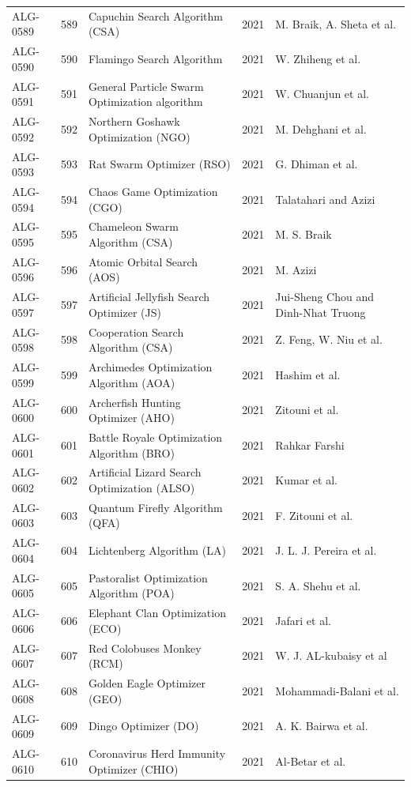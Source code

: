 \documentclass[8pt]{article}
\begin{document}
\begin{landscape}
\begin{longtable}{P{1.7cm}rP{10.0cm}rP{7.2cm}}
ALG-0589 & 589 & Capuchin Search Algorithm (CSA) & 2021 & M. Braik, A. Sheta et al. \\
ALG-0590 & 590 & Flamingo Search Algorithm & 2021 & W. Zhiheng et al. \\
ALG-0591 & 591 & General Particle Swarm Optimization algorithm & 2021 & W. Chuanjun  et al. \\
ALG-0592 & 592 & Northern Goshawk Optimization (NGO) & 2021 & M. Dehghani et al. \\
ALG-0593 & 593 & Rat Swarm Optimizer (RSO) & 2021 & G. Dhiman et al. \\
ALG-0594 & 594 & Chaos Game Optimization (CGO) & 2021 & Talatahari and Azizi \\
ALG-0595 & 595 & Chameleon Swarm Algorithm (CSA) & 2021 & M. S. Braik \\
ALG-0596 & 596 & Atomic Orbital Search (AOS) & 2021 & M. Azizi \\
ALG-0597 & 597 & Artificial Jellyfish Search Optimizer (JS) & 2021 & Jui-Sheng Chou and Dinh-Nhat Truong \\
ALG-0598 & 598 & Cooperation Search Algorithm (CSA) & 2021 & Z. Feng, W. Niu et al. \\
ALG-0599 & 599 & Archimedes Optimization Algorithm (AOA) & 2021 & Hashim et al. \\
ALG-0600 & 600 & Archerfish Hunting Optimizer (AHO) & 2021 & Zitouni et al. \\
ALG-0601 & 601 & Battle Royale Optimization Algorithm (BRO) & 2021 & Rahkar Farshi \\
ALG-0602 & 602 & Artificial Lizard Search Optimization (ALSO) & 2021 & Kumar et al. \\
ALG-0603 & 603 & Quantum Firefly Algorithm (QFA) & 2021 & F. Zitouni et al. \\
ALG-0604 & 604 & Lichtenberg Algorithm (LA) & 2021 & J. L. J. Pereira et al. \\
ALG-0605 & 605 & Pastoralist Optimization Algorithm (POA) & 2021 & S. A. Shehu et al. \\
ALG-0606 & 606 & Elephant Clan Optimization (ECO) & 2021 & Jafari et al. \\
ALG-0607 & 607 & Red Colobuses Monkey (RCM) & 2021 & W. J. AL-kubaisy et al \\
ALG-0608 & 608 & Golden Eagle Optimizer (GEO) & 2021 & Mohammadi-Balani et al. \\
ALG-0609 & 609 & Dingo Optimizer (DO) & 2021 & A. K. Bairwa et al. \\
ALG-0610 & 610 & Coronavirus Herd Immunity Optimizer (CHIO) & 2021 & Al-Betar et al. \\

\end{longtable}
\end{landscape}
\end{document}
